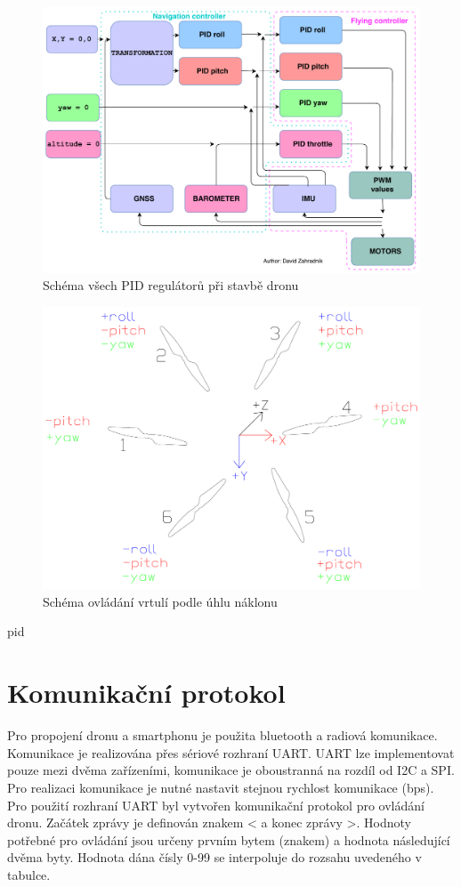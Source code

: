 \begin{figure}[h]
	\centering
	\includegraphics[width=15cm]{pictures/PIDsDiagram.pdf}
	\caption{Schéma všech PID regulátorů při stavbě dronu}
\end{figure}


\begin{figure}[h]
	\centering
	\includegraphics[width=12cm]{pictures/pid.pdf}
	\caption{Schéma ovládání vrtulí podle úhlu náklonu}
\end{figure}
pid

\section{Komunikační protokol}
Pro propojení dronu a smartphonu je použita bluetooth a radiová komunikace. Komunikace je realizována přes sériové rozhraní UART. UART lze implementovat pouze mezi dvěma zařízeními, komunikace je oboustranná na rozdíl od I2C a SPI. Pro realizaci komunikace je nutné nastavit stejnou rychlost komunikace (bps).\\
Pro použití rozhraní UART byl vytvořen komunikační protokol pro ovládání dronu. Začátek zprávy je definován znakem < a konec zprávy >. Hodnoty potřebné pro ovládání jsou určeny prvním bytem (znakem) a hodnota následující dvěma byty. Hodnota dána čísly 0-99 se interpoluje do rozsahu uvedeného v tabulce.\\

